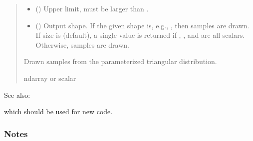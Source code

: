 \documentclass[letterpaper,10pt,english]{sphinxmanual}
\begin{document}
\begin{fulllineitems}
\begin{quote}
\begin{description}
\begin{itemize}
\item {} 
\sphinxAtStartPar
{} () \textendash{} Upper limit, must be larger than .

\item {} 
\sphinxAtStartPar
{} (\sphinxstyleliteralemphasis{\sphinxupquote{, }}) \textendash{} Output shape.  If the given shape is, e.g., , then
 samples are drawn.  If size is  (default),
a single value is returned if , , and 
are all scalars.  Otherwise, 
samples are drawn.

\end{itemize}

\sphinxAtStartPar
{} \textendash{} Drawn samples from the parameterized triangular distribution.

\sphinxAtStartPar
ndarray or scalar

\end{description}\end{quote}


\begin{sphinxseealso}{See also:}
\begin{description}
\sphinxAtStartPar
which should be used for new code.

\end{description}


\end{sphinxseealso}

\subsubsection*{Notes}


\end{fulllineitems}
\end{document}
